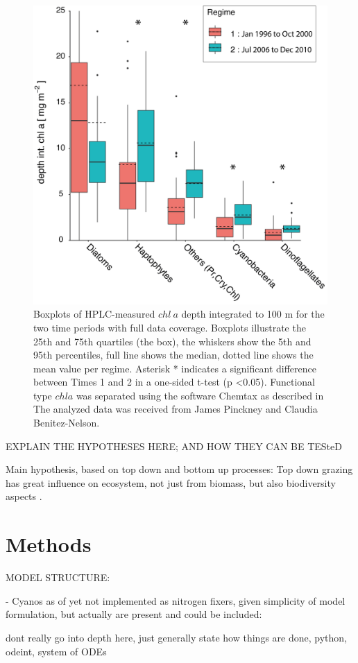 \begin{figure}
\centering
\includegraphics[trim = 0mm 0mm 0mm 0mm, clip, width=.7\linewidth]{./Chp2-Pre/PFT_groupsAsset511.png}
\caption[Scheme]{\small {Boxplots of HPLC-measured $chl~a$ depth integrated to 100 m for the two time periods with full data coverage. Boxplots illustrate the 25th and 75th quartiles (the box), the whiskers show the 5th and 95th percentiles, full line shows the median, dotted line shows the mean value per regime. Asterisk * indicates a significant difference between Times 1 and 2 in a one-sided t-test (p \textless	 0.05). Functional type $chl a$ was separated using the software Chemtax as described in \citet{Pinckney2015} The analyzed data was received from James Pinckney and Claudia Benitez-Nelson.}}
\label{PFTcariaco}
\end{figure}

EXPLAIN THE HYPOTHESES HERE; AND HOW THEY CAN BE TESteD

Main hypothesis, based on top down and bottom up processes:
Top down grazing has great influence on ecosystem, not just from biomass, but also biodiversity aspects \cite{Prowe2012c}.


\section{Methods}

MODEL STRUCTURE: 

- Cyanos as of yet not implemented as nitrogen fixers, given simplicity of model formulation, but actually are present and could be included: \citep{Montes2013}

dont really go into depth here, just generally state how things are done, python, odeint, system of ODEs

